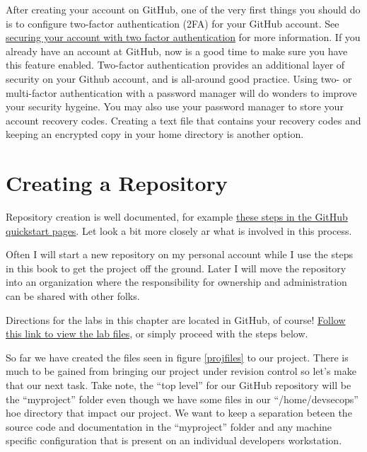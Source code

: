 \justify{}
After creating your account on GitHub, one of the very first things you should do is to configure two-factor authentication (2FA) for your GitHub account.
See \href{https://docs.github.com/en/github/authenticating-to-github/securing-your-account-with-two-factor-authentication-2fa}{securing your account with two factor authentication}
for more information. If you already have an account at GitHub, now is a good time to make sure you have this feature enabled. Two-factor authentication provides
an additional layer of security on your Github account, and is all-around good practice. Using two- or multi-factor authentication with a
password manager will do wonders
to improve your security hygeine. You may also use your password manager to store your account recovery codes. Creating a text file
that contains your recovery codes and keeping an encrypted copy in your home directory is another option.

\section{Creating a Repository}

Repository creation is well documented, for example
\href{https://docs.github.com/en/get-started/quickstart/create-a-repo}{these steps in the GitHub quickstart pages}. Let look a bit
more closely ar what is involved in this process.

\justify{}
Often I will start a new repository on my personal account while I use the steps in this book to get the project off the ground.
Later I will move the repository into an organization where the responsibility for ownership and administration can be
shared with other folks.

\justify{}
Directions for the labs in this chapter are located in GitHub, of course!
\href{https://github.com/devsecfranklin/devsecops-tactical-workbook/tree/main/code/ch5}{Follow this link to view the lab files},
or simply proceed with the steps below.

\justify{}
So far we have created the files seen in figure \ref{projfiles} to our project. There is much to be gained from bringing our project under revision control so let's make that our next task. Take note, the ``top level'' for our GitHub repository will be the ``myproject'' folder even though we have some files in our ``/home/devsecops'' hoe directory that impact our project. We want to keep a separation beteen the source code and documentation in the ``myproject'' folder and any machine specific configuration that is present on an individual developers workstation.

